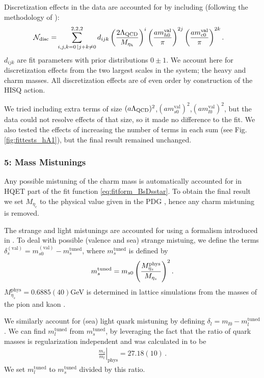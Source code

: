 Discretization effects in the data are accounted for by including (following the methodology of \cite{McNeile:2012qf}):
\begin{align}
    \label{eq:fitfun_hA1}
  \mathcal{N}_{\text{disc}} = &\sum_{i,j,k=0\,|j+k\neq 0}^{2,2,2} d_{ijk} \left({2\Lambda_{\text{QCD}}\over M_{\eta_h} }\right)^{i} \left({ am^{\text{val}}_{h0} \over \pi }\right)^{2j} \left({ am^{\text{val}}_{c0} \over \pi }\right)^{2k}.
\end{align}
$d_{ijk}$ are fit parameters with prior distributions $0\pm 1$. We account here for discretization effects from the two largest scales in the system; the heavy and charm masses. All discretization effects are of even order by construction of the HISQ action.

We tried including extra terms of size $(a\Lambda_{\text{QCD}})^2$,$(am^{\text{val}}_{s0})^2$,$(am^{\text{val}}_{l0})^2$, but the data could not resolve effects of that size, so it made no difference to the fit. We also tested the effects of increasing the number of terms in each sum (see Fig. \ref{fig:fittests_hA1}), but the final result remained unchanged.

\subsubsection{5: Mass Mistunings}
\label{sec:mistuning_BsDsstar}

Any possible mistuning of the charm mass is automatically accounted for in HQET part of the fit function \eqref{eq:fitform_BsDsstar}. To obtain the final result we set $M_{\eta_c}$ to the physical value given in the PDG \cite{PhysRevD.98.030001}, hence any charm mistuning is removed.

The strange and light mistunings are accounted for using a formalism introduced in \cite{Chakraborty:2014aca}. To deal with possible (valence and sea) strange mistuing, we define the terms $\delta^{(\text{val})}_s = m^{(\text{val})}_{s0}- m_s^{\text{tuned}}$, where $m_s^{\text{tuned}}$ is defined by
\begin{align}
  m_s^{\text{tuned}} = m_{s0} \left({ M^{\text{phys}}_{\eta_s} \over M_{\eta_s} }\right)^2.
  \label{eq:strange_mistuning}
\end{align}
$M_{\eta_s}^{\text{phys}} = 0.6885(40)$GeV is determined in lattice simulations from the masses of the pion and kaon \cite{Dowdall:2013rya}.

We similarly account for (sea) light quark mistuning by defining $\delta_l = m_{l0} - m_l^{\text{tuned}}$. We can find $m_l^{\text{tuned}}$ from $m_s^{\text{tuned}}$, by leveraging the fact that the ratio of quark masses is regularization independent and was calculated in \cite{Bazavov:2017lyh} to be
\begin{align}
  \left.\frac{m_s}{m_l}\right\rvert_{\textrm{phys}} = 27.18(10)\,.
\end{align}
We set $m_l^{\text{tuned}}$ to $m_s^{\text{tuned}}$ divided by this ratio.

